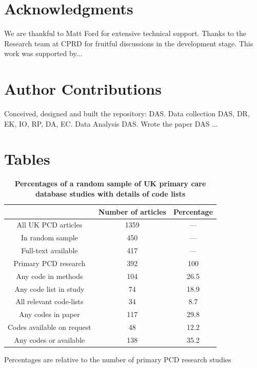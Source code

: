 \documentclass[10pt]{article}
\begin{document}
\section*{Acknowledgments}
We are thankful to Matt Ford for extensive technical support. Thanks to the Research team at CPRD for fruitful discussions in the development stage.  This work was supported by...

\section*{Author Contributions}

Conceived, designed and built the repository: DAS. Data collection DAS, DR, EK, IO, RP, DA, EC.  Data Analysis DAS. Wrote the paper DAS ...



\section*{Tables}

\begin{table}[!ht]
  \caption{
    \bf{Percentages of a random sample of UK primary care database studies with details of code lists}}
  \begin{tabular}{|c|c|c|}
    \hline
                 & Number of articles & Percentage \\
    \hline
    All UK PCD articles        & 1359 & ---  \\
    In random sample           & 450  & ---  \\
    Full-text available        & 417  & ---  \\
    Primary PCD research       & 392  & 100  \\
    Any code in methods        & 104  & 26.5 \\
    Any code list in study     & 74   & 18.9 \\
    All relevant code-lists    & 34   & 8.7  \\
    Any codes in paper         & 117  & 29.8 \\
    Codes available on request & 48   & 12.2 \\
    Any codes or available     & 138  & 35.2 \\
    \hline
  \end{tabular}
  \begin{flushleft}Percentages are relative to the number of primary PCD research studies 
  \end{flushleft}
  \label{tab:table1_percentages}
\end{table}
\end{document}
